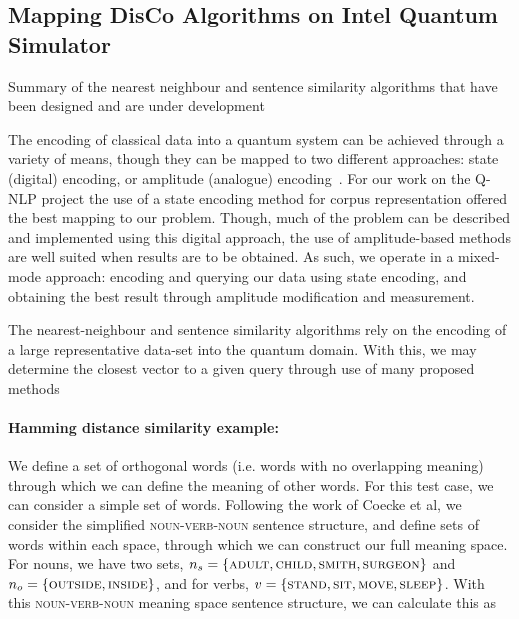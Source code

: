 \subsection{Mapping DisCo Algorithms on Intel Quantum Simulator}%
\label{sec:mapping_disco_algorithms_on_intel_quantum_simulator}
Summary of the nearest neighbour and sentence similarity algorithms that have been designed and are under development

The encoding of classical data into a quantum system can be achieved through a variety of means, though they can be mapped to two different approaches: state (digital) encoding, or amplitude (analogue) encoding~\cite{Schuld_2017,Mitarai_Kitagawa_Fujii_2019}. For our work on the Q-NLP project the use of a state encoding method for corpus representation offered the best mapping to our problem. Though, much of the problem can be described and implemented using this digital approach, the use of amplitude-based methods are well suited when results are to be obtained. As such, we operate in a mixed-mode approach: encoding and querying our data using state encoding, and obtaining the best result through amplitude modification and measurement.

The nearest-neighbour and sentence similarity algorithms rely on the encoding of a large representative data-set into the quantum domain. With this, we may determine the closest vector to a given query through use of many proposed methods~\cite{Wiebe_Kapoor_Svore_2014}


\iftrue
\paragraph{Hamming distance similarity example:}\label{par:example_hamming}
We define a set of orthogonal words (i.e. words with no overlapping meaning) through which we can define the meaning of other words. For this test case, we can consider a simple set of words. Following the work of Coecke et al, we consider the simplified \textsc{noun-verb-noun} sentence structure, and define sets of words within each space, through which we can construct our full meaning space. For nouns, we have two sets, $n_s = \{\textsc{adult},\textsc{child},\textsc{smith},\textsc{surgeon}\}$ and $n_o = \{\textsc{outside},\textsc{inside}\}$, and for verbs, $v = \{\textsc{stand},\textsc{sit},\textsc{move},\textsc{sleep}\}$. With this \textsc{noun-verb-noun} meaning space sentence structure, we can calculate this as

